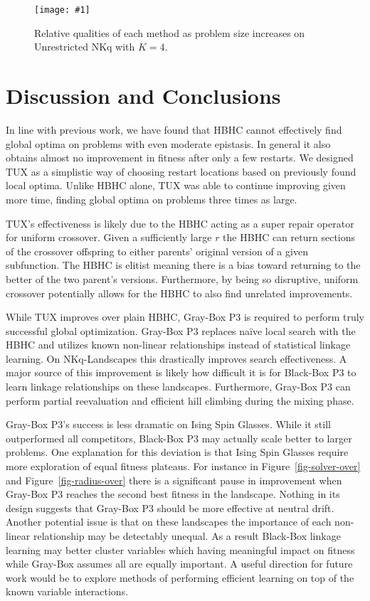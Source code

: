 \documentclass{sig-alternate}
\newcommand{\includegraphicsfit}[1]
{\texttt{[image: \#1]}}
\begin{document}
\begin{figure}
  \centering
  \includegraphicsfit{length-un}
  \caption{Relative qualities of each method as problem size increases on Unrestricted NKq
  with $K=4$.}
  \label{fig-length-un}
\end{figure}

\section{Discussion and Conclusions}
In line with previous work, we have found that HBHC cannot effectively find global optima
on problems with even moderate epistasis. In general it also obtains almost no improvement
in fitness after only a few restarts. We designed TUX as a simplistic way of choosing
restart locations based on previously found local optima. Unlike HBHC alone, TUX
was able to continue improving given more time, finding global optima on problems three
times as large.

TUX's effectiveness is likely due to the HBHC acting as a super repair operator for uniform crossover.
Given a sufficiently large $r$ the HBHC can return sections of the crossover offspring to either
parents' original version of a given subfunction. The HBHC is elitist meaning there is a bias toward
returning to the better of the two parent's versions. Furthermore, by being so disruptive,
uniform crossover potentially allows for the HBHC to also find unrelated improvements.

While TUX improves over plain HBHC, Gray-Box P3 is required to perform truly successful
global optimization. Gray-Box P3 replaces na\"{i}ve local search with the HBHC and utilizes
known non-linear relationships instead of statistical linkage learning. On NKq-Landscapes this drastically
improves search effectiveness. A major source of this improvement is likely how difficult it is
for Black-Box P3 to learn linkage relationships on these landscapes. Furthermore, Gray-Box P3
can perform partial reevaluation and efficient hill climbing during the mixing phase.

Gray-Box P3's success is less dramatic on Ising Spin Glasses.
While it still outperformed all competitors, Black-Box P3 may actually scale better to larger
problems. One explanation for this deviation is that Ising Spin Glasses require more
exploration of equal fitness plateaus. For instance in Figure~\ref{fig-solver-over} and Figure~\ref{fig-radius-over}
there is a significant pause in improvement when Gray-Box P3 reaches the second best fitness in the landscape.
Nothing in its design suggests that Gray-Box P3 should be more effective at neutral drift. Another potential
issue is that on these landscapes the importance of each non-linear relationship may be detectably unequal.
As a result Black-Box linkage learning may better cluster variables which having meaningful
impact on fitness while Gray-Box assumes all are equally important. A useful direction for future work
would be to explore methods of performing efficient learning on top of the known variable interactions.
\end{document}
